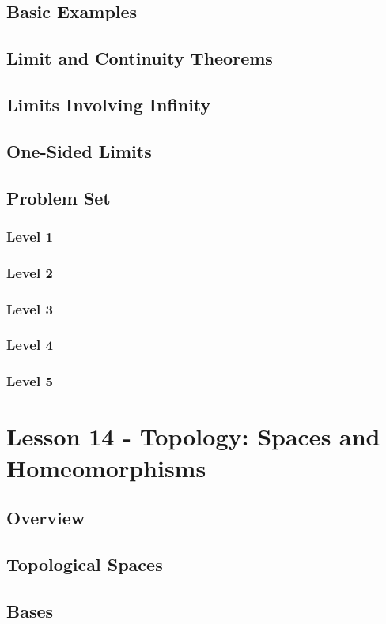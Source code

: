 \documentclass{article}
\begin{document}
\subsection{Basic Examples}
\subsection{Limit and Continuity Theorems}
\subsection{Limits Involving Infinity}
\subsection{One-Sided Limits}
\subsection{Problem Set}
\subsubsection{Level 1}
\subsubsection{Level 2}
\subsubsection{Level 3}
\subsubsection{Level 4}
\subsubsection{Level 5}
\pagebreak

\section{Lesson 14 - Topology: Spaces and Homeomorphisms}
\subsection{Overview}
\subsection{Topological Spaces}
\subsection{Bases}
\end{document}
